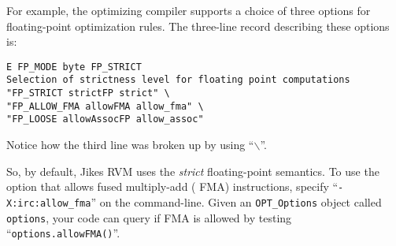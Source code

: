 For example, the optimizing compiler supports a choice of three
options for floating-point optimization rules.  The three-line record
describing these options is:
\begin{verbatim}
E FP_MODE byte FP_STRICT
Selection of strictness level for floating point computations
"FP_STRICT strictFP strict" \
"FP_ALLOW_FMA allowFMA allow_fma" \
"FP_LOOSE allowAssocFP allow_assoc"
\end{verbatim}
Notice how the third line was broken up by using ``$\backslash$''.

So, by default, Jikes RVM uses the {\em strict} floating-point
semantics.  To use the option that allows fused multiply-add
({\texonly{\sc} FMA})
instructions, specify ``{\tt -X:irc:allow\_fma}'' on the command-line.
Given an {\tt OPT\_Options} object called {\tt options}, your code can
query if {\texonly{\sc} FMA} is allowed by testing ``{\tt op\-tions\-.al\-low\-F\-M\-A()}''.

